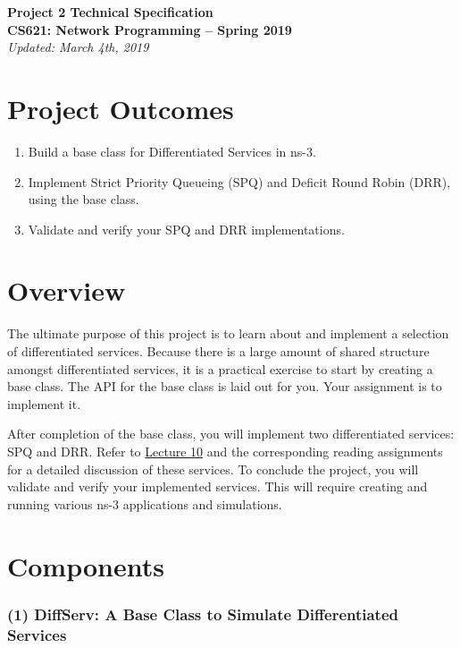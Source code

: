 \documentclass[10pt]{article}
\begin{document}
\Large
{\bf Project 2 Technical Specification}\\
{\bf \noindent CS621: Network Programming -- Spring 2019}\\
\noindent \emph{Updated: March 4th, 2019}\\

\normalsize
\setcounter{secnumdepth}{0}
\section{Project Outcomes}
\begin{enumerate}
    \item Build a base class for Differentiated Services in ns-3.

    \item Implement Strict Priority Queueing (SPQ) and Deficit Round Robin (DRR), using the base class.

    \item Validate and verify your SPQ and DRR implementations.

\end{enumerate}

\section{Overview}
The ultimate purpose of this project is to learn about and implement a selection of differentiated services. Because there is a large amount of shared structure amongst differentiated services, it is a practical exercise to start by creating a base class. The API for the base class is laid out for you. Your assignment is to implement it.

After completion of the base class, you will implement two differentiated services: SPQ and DRR. Refer to \href{http://cs621.cs.usfca.edu/v/lectures/Lecture10.pdf}{Lecture 10} and the corresponding reading assignments for a detailed discussion of these services. To conclude the project, you will validate and verify your implemented services. This will require creating and running various ns-3 applications and simulations.

\section{Components}
\subsubsection{(1) DiffServ: A Base Class to Simulate Differentiated Services}
\end{document}

